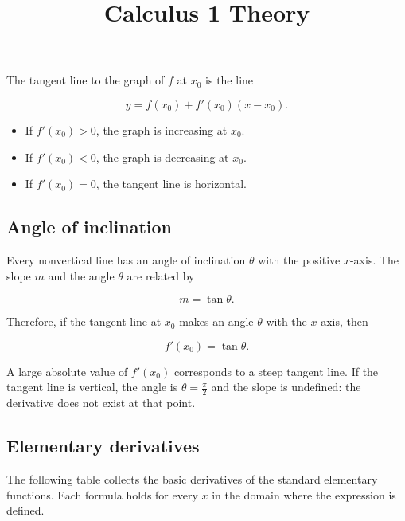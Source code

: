 \documentclass[11pt,a4paper]{article} \usepackage[T1]{fontenc}
\theoremstyle{plain} \newtheorem{theorem}{Theorem} \title{Calculus 1 Theory}
\begin{document}
The tangent line to the graph of $f$ at $x_0$ is the line

\[
y = f(x_0) + f'(x_0)(x - x_0).
\]

\begin{itemize}
\item If $f'(x_0)>0$, the graph is increasing at $x_0$.
\item If $f'(x_0)<0$, the graph is decreasing at $x_0$.
\item If $f'(x_0)=0$, the tangent line is horizontal.
\end{itemize}

\subsection*{Angle of inclination}

Every nonvertical line has an angle of inclination $\theta$ with the positive
$x$-axis. The slope $m$ and the angle $\theta$ are related by

\[
m = \tan\theta.
\]

Therefore, if the tangent line at $x_0$ makes an angle $\theta$ with the
$x$-axis, then

\[
f'(x_0) = \tan\theta.
\]

A large absolute value of $f'(x_0)$ corresponds to a steep tangent line. If the
tangent line is vertical, the angle is $\theta=\frac{\pi}{2}$ and the slope is
undefined: the derivative does not exist at that point.

\subsection*{Elementary derivatives}

The following table collects the basic derivatives of the standard elementary
functions. Each formula holds for every $x$ in the domain where the expression
is defined.
\end{document}
